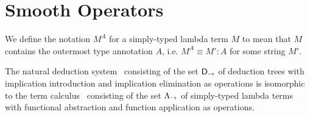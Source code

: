 \section{Smooth Operators}

\begin{definition}
We define the notation $M^{A}$ for a simply-typed lambda term $M$ to mean that
$M$ contains the outermost type annotation $A$, i.e. $M^A \equiv M':A$ for some
string $M'$.
\end{definition}

\begin{theorem}

The natural deduction system \implnpi\ consisting of the set $\mathsf{D}_\to$ of
deduction trees with implication introduction and implication elimination as
operations is isomorphic to the term calculus \stlambda\ consisting of the set
$\Lambda_\to$ of simply-typed lambda terms with functional abstraction and
function application as operations.

\end{theorem}

